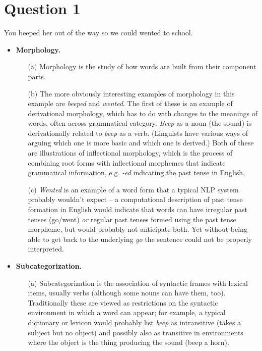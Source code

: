 \documentclass[11pt]{article}
\begin{document}
\section*{Question 1}

\begin{center}
You beeped her out of the way so we could wented to school.
\end{center}

\begin{itemize}
\item {\bf Morphology.}
\begin{itemize}
\item[(a)] Morphology is the study of how words are built from their component parts.
\item[(b)] The more obviously interesting examples of morphology in this example are \emph{beeped} and \emph{wented}.  The first of these is an example of derivational morphology, which has to do with changes to the meanings of words, often across grammatical category.  \emph{Beep} as a noun (the sound) is derivationally related to \emph{beep} as a verb.  (Linguists have various ways of arguing which one is more basic and which one is derived.)  Both of these are illustrations of inflectional morphology, which is the process of combining root forms with inflectional morphemes that indicate grammatical information, e.g. \emph{-ed} indicating the past tense in English.
\item[(c)] \emph{Wented} is an example of a word form that a typical NLP system probably wouldn't expect -- a computational description of past tense formation in English would indicate that words can have irregular past tenses (go/went) \emph{or} regular past tenses formed using the past tense morpheme, but would probably not anticipate both.  Yet without being able to get back to the underlying \emph{go} the sentence could not be properly interpreted.
\end{itemize}
\item {\bf Subcategorization.}
\begin{itemize}
\item[(a)] Subcategorization is the association of syntactic frames with lexical items, usually verbs (although some nouns can have them, too).  Traditionally these are viewed as restrictions on the syntactic environment in which a word can appear; for example, a typical dictionary or lexicon would probably list \emph{beep} as intransitive (takes a subject but no object) and possibly also as transitive in environments where the object is the thing producing the sound (beep a horn).

\end{itemize}
\end{itemize}
\end{document}
